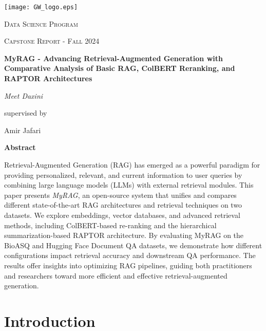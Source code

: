 \documentclass{scrartcl}
\renewenvironment{abstract}{
    \centering
    \textbf{Abstract}
    \vspace{0.5cm}
    \par\itshape
    \begin{minipage}{0.7\linewidth}}{\end{minipage}
    \noindent\ignorespaces
}
\begin{document}
\begin{titlepage}
	\centering
	\texttt{[image: GW\_logo.eps]}\par
	\vspace{2cm}
	{\scshape\LARGE Data Science Program \par}
	\vspace{1cm}
	{\scshape\Large Capstone Report - Fall 2024\par}
	\vspace{1.5cm}
	{\huge\bfseries MyRAG - Advancing Retrieval-Augmented Generation with Comparative Analysis of Basic RAG, ColBERT Reranking, and RAPTOR Architectures \par}
	\vspace{2cm}
	{\Large\itshape Meet Daxini \\}\par
	\vspace{1.5cm}
	supervised by\par
	Amir Jafari
\newpage

	\vfill
	\begin{abstract}
Retrieval-Augmented Generation (RAG) has emerged as a powerful paradigm for providing personalized, relevant, and current information to user queries by combining large language models (LLMs) with external retrieval modules. This paper presents \textit{MyRAG}, an open-source system that unifies and compares different state-of-the-art RAG architectures and retrieval techniques on two datasets. We explore embeddings, vector databases, and advanced retrieval methods, including ColBERT-based re-ranking and the hierarchical summarization-based RAPTOR architecture. By evaluating MyRAG on the BioASQ and Hugging Face Document QA datasets, we demonstrate how different configurations impact retrieval accuracy and downstream QA performance. The results offer insights into optimizing RAG pipelines, guiding both practitioners and researchers toward more efficient and effective retrieval-augmented generation.
	\end{abstract}
	\vfill
\end{titlepage}
\tableofcontents
\newpage
\section{Introduction}
\end{document}
